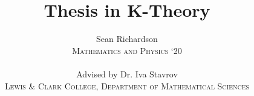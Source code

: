 
\title[Book]{Thesis in K-Theory}
\author{Sean Richardson \\ \vspace{.25cm} {\scshape{\large Mathematics and Physics `20}} \\ \hfill \vspace{.3cm} \\ {Advised by Dr. Iva Stavrov} \\ \vspace{.25cm} {\scshape{\large Lewis \& Clark College, Department of Mathematical Sciences}}} 

\maketitle
